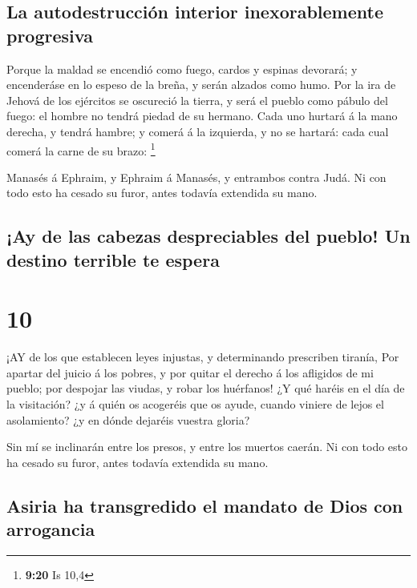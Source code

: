 \hypertarget{la-autodestrucciuxf3n-interior-inexorablemente-progresiva}{%
\subsection{La autodestrucción interior inexorablemente
progresiva}\label{la-autodestrucciuxf3n-interior-inexorablemente-progresiva}}

 Porque la maldad se encendió como fuego, cardos y espinas
devorará; y encenderáse en lo espeso de la breña, y serán alzados como
humo.  Por la ira de Jehová de los ejércitos se oscureció
la tierra, y será el pueblo como pábulo del fuego: el hombre no tendrá
piedad de su hermano.  Cada uno hurtará á la mano derecha,
y tendrá hambre; y comerá á la izquierda, y no se hartará: cada cual
comerá la carne de su brazo: \footnote{\textbf{9:20} Is 10,4}

 Manasés á Ephraim, y Ephraim á Manasés, y entrambos contra
Judá. Ni con todo esto ha cesado su furor, antes todavía extendida su
mano.

\hypertarget{ay-de-las-cabezas-despreciables-del-pueblo-un-destino-terrible-te-espera}{%
\subsection{¡Ay de las cabezas despreciables del pueblo! Un destino
terrible te
espera}\label{ay-de-las-cabezas-despreciables-del-pueblo-un-destino-terrible-te-espera}}

\hypertarget{section-9}{%
\section{10}\label{section-9}}

 ¡AY de los que establecen leyes injustas, y determinando
prescriben tiranía,  Por apartar del juicio á los pobres, y
por quitar el derecho á los afligidos de mi pueblo; por despojar las
viudas, y robar los huérfanos!  ¿Y qué haréis en el día de
la visitación? ¿y á quién os acogeréis que os ayude, cuando viniere de
lejos el asolamiento? ¿y en dónde dejaréis vuestra gloria?

 Sin mí se inclinarán entre los presos, y entre los muertos
caerán. Ni con todo esto ha cesado su furor, antes todavía extendida su
mano.

\hypertarget{asiria-ha-transgredido-el-mandato-de-dios-con-arrogancia}{%
\subsection{Asiria ha transgredido el mandato de Dios con
arrogancia}\label{asiria-ha-transgredido-el-mandato-de-dios-con-arrogancia}}

